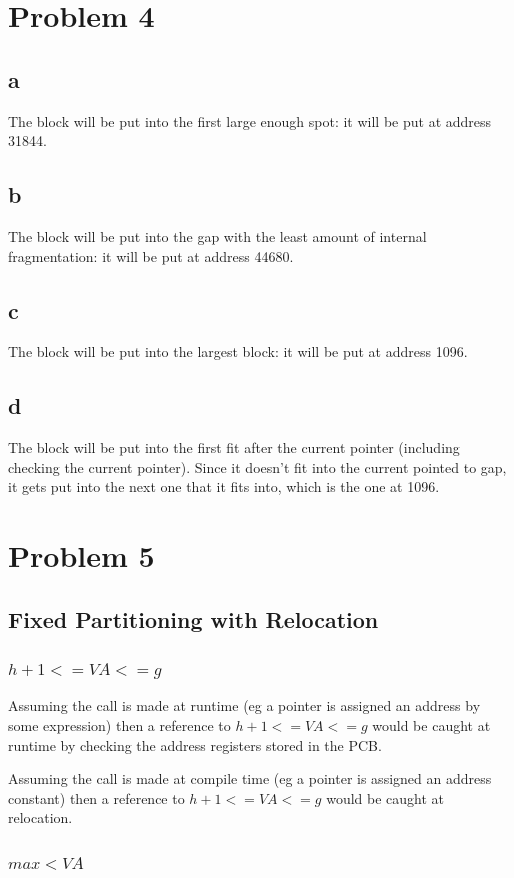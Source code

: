 \documentclass[11pt]{article} %
\begin{document}
\section*{Problem 4}
\subsection*{a}
The block will be put into the first large enough spot: it will be put at address 31844.
\subsection*{b}
The block will be put into the gap with the least amount of internal fragmentation: it will be put at address 44680.
\subsection*{c}
The block will be put into the largest block: it will be put at address 1096.
\subsection*{d}
The block will be put into the first fit after the current pointer (including checking the current pointer). Since it doesn't fit into the current pointed to gap, it gets put into the next one that it fits into, which is the one at 1096.
\section*{Problem 5}
\subsection*{Fixed Partitioning with Relocation}
\subsubsection*{$h+1 <= VA <= g$}

Assuming the call is made at runtime (eg a pointer is assigned an address by some expression) then a reference to $h+1 <= VA <= g$ would be caught at runtime by checking the address registers stored in the PCB.

\bigskip

\noindent Assuming the call is made at compile time (eg a pointer is assigned an address constant) then a reference to $h+1 <= VA <= g$ would be caught at relocation.

\subsubsection*{$max < VA $}
\end{document}
